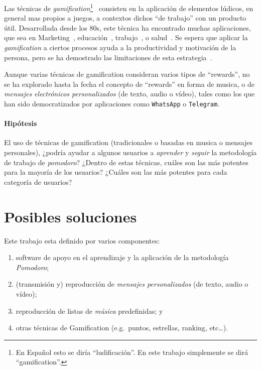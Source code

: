\documentclass[12pt,letterpaper]{report}
\providecommand{\tightlist}{%
  \setlength{\itemsep}{0pt}\setlength{\parskip}{0pt}}
\let\oldparagraph\paragraph
\renewcommand{\paragraph}[1]{\oldparagraph{#1}\mbox{}}
\begin{document}
Las técnicas de \emph{gamification}\footnote{En Español esto se diría
``ludificación''. En este trabajo simplemente se dirá
``gamification''.}~\cite{deterding2011gamification} consisten en la aplicación de
elementos lúdicos, en general mas propios a juegos, a contextos dichos ``de
trabajo'' con un producto útil.  Desarrollada desde los 80s, este técnica ha
encontrado muchas aplicaciones, que sea en Marketing~\cite{hamari2010game},
educación~\cite{desousa2014systematic-gamification},
trabajo~\cite{oravec2015gamification}, o salud~\cite{pereira2014gamification-review}.
Se espera que aplicar la \emph{gamification} a ciertos procesos ayuda a la
productividad y motivación de la persona, pero se ha demostrado las
limitaciones de esta estrategia~\cite{hamari2014gamification}.

Aunque varias técnicas de gamification consideran varios tipos de ``rewards'',
no se ha explorado hasta la fecha el concepto de ``rewards'' en forma de
musica, o de \emph{mensajes electrónicos personalizados} (de texto, audio o
vídeo), tales como los que han sido  democratizados por aplicaciones como
\texttt{WhatsApp} o \texttt{Telegram}.

\paragraph{Hipótesis}
El uso de técnicas de gamification (tradicionales o basadas en musica o
mensajes personales), ¿podría ayudar a algunos usuarios a \emph{aprender} y
\emph{seguir} la metodología de trabajo de \emph{pomodoro}? ¿Dentro de estas
técnicas, cuáles son las más potentes para la mayoría de los usuarios? ¿Cuáles
son las más potentes para cada categoría de usuarios?

\newpage
\hypertarget{posibles-soluciones}{%
\section{Posibles soluciones}\label{posibles-soluciones}}

Este trabajo esta definido por varios componentes:

\begin{enumerate}\tightlist{}
\item software de apoyo en el aprendizaje y la aplicación de la metodología \emph{Pomodoro};
\item (transmisión y) reproducción de \emph{mensajes personalizados} (de texto, audio o vídeo);
\item reproducción de listas de \emph{música} predefinidas; y 
\item otras técnicas de Gamification (e.g.~puntos, estrellas, ranking, etc\ldots).
\end{enumerate}
\end{document}

